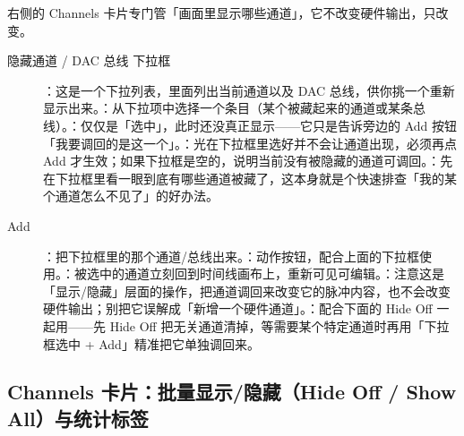 \documentclass[11pt,oneside,openany]{book}
\begin{document}
右侧的 Channels 卡片专门管「画面里显示哪些通道」，它不改变硬件输出，只改变。

\begin{description}
\item[隐藏通道 / DAC 总线 下拉框] ：这是一个下拉列表，里面列出当前通道以及 DAC 总线，供你挑一个重新显示出来。：从下拉项中选择一个条目（某个被藏起来的通道或某条总线）。：仅仅是「选中」，此时还没真正显示——它只是告诉旁边的 Add 按钮「我要调回的是这一个」。：光在下拉框里选好并不会让通道出现，必须再点 Add 才生效；如果下拉框是空的，说明当前没有被隐藏的通道可调回。：先在下拉框里看一眼到底有哪些通道被藏了，这本身就是个快速排查「我的某个通道怎么不见了」的好办法。

\item[Add] ：把下拉框里的那个通道/总线出来。：动作按钮，配合上面的下拉框使用。：被选中的通道立刻回到时间线画布上，重新可见可编辑。：注意这是「显示/隐藏」层面的操作，把通道调回来改变它的脉冲内容，也不会改变硬件输出；别把它误解成「新增一个硬件通道」。：配合下面的 Hide Off 一起用——先 Hide Off 把无关通道清掉，等需要某个特定通道时再用「下拉框选中 + Add」精准把它单独调回来。
\end{description}

\subsection{Channels 卡片：批量显示/隐藏（Hide Off / Show All）与统计标签}
\end{document}

